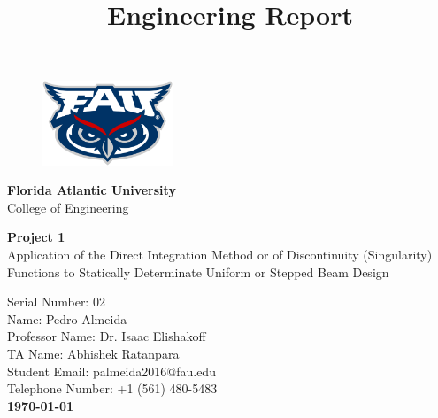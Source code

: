\documentclass[a4paper]{article}
\begin{document}
\title{Engineering Report}


\begin{titlepage}
	\begin{center}
		\begin{figure}[htb!]
			\begin{flushleft}
				\includegraphics[width=3.9cm]{images/fau_logo.jpeg}
			\end{flushleft}
		\end{figure}
        \vspace{-2.5cm}
        \hspace{2.1cm}\Large{\textbf{Florida Atlantic University}}\\
        \hspace{2.1cm}\Large{College of Engineering}\\
        
        \vspace{200pt}
        
        \LARGE{\textbf{Project 1}}\\ 
        \Large{Application of the Direct Integration Method or of Discontinuity (Singularity) Functions to Statically Determinate Uniform or Stepped Beam Design}\\ 
        
        \vspace{100pt}
        
        \hfill Serial Number: 02 \\
        
        \vspace{30pt} 
        \hfill Name: Pedro Almeida\\
        \hfill Professor Name: Dr. Isaac Elishakoff\\
        \hfill TA Name: Abhishek Ratanpara\\
        \hfill Student Email: palmeida2016@fau.edu\\
        \hfill Telephone Number: +1 (561) 480-5483\\
        
        
        \vspace{\fill}
        \LARGE \bf{\today}
          
	\end{center}
\end{titlepage}
\end{document}
